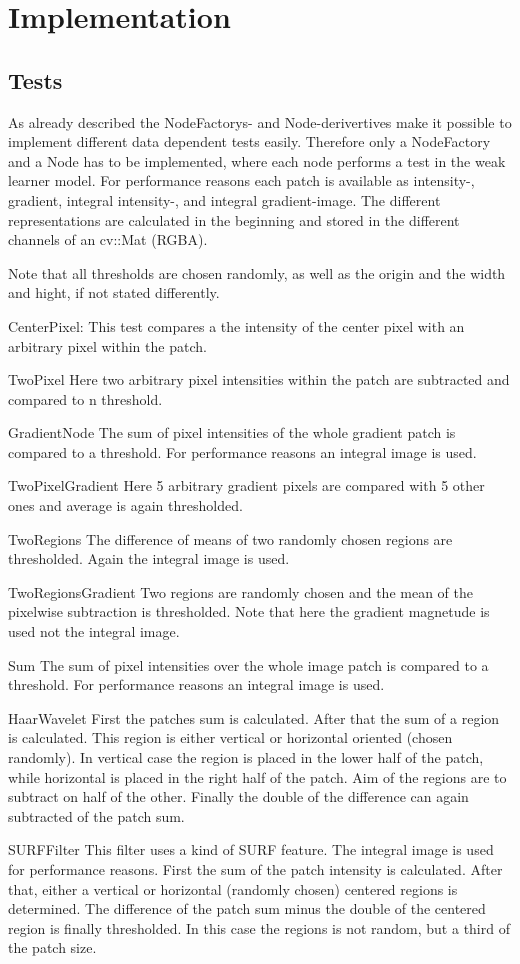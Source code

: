 \section{Implementation}
\label{sec:implementation}

\subsection{Tests}
As already described the NodeFactorys- and Node-derivertives make it possible to implement different data dependent tests easily. Therefore only a NodeFactory and a Node has to be implemented, where each node performs a test in the weak learner model.
For performance reasons each patch is available as intensity-, gradient, integral intensity-, and integral gradient-image. The different representations are calculated in the beginning and stored in the different channels of an cv::Mat (RGBA).

Note that all thresholds are chosen randomly, as well as the origin and the width and hight, if not stated differently.

CenterPixel:
This test compares a the intensity of the center pixel with an arbitrary pixel within the patch.

TwoPixel
Here two arbitrary pixel intensities within the patch are subtracted and compared to n threshold.

GradientNode
The sum of pixel intensities of the whole gradient patch is compared to a threshold. For performance reasons an integral image is used. 

TwoPixelGradient
Here 5 arbitrary gradient pixels are compared with 5 other ones and average is again thresholded.

TwoRegions
The difference of means of two randomly chosen regions are thresholded. Again the integral image is used.

TwoRegionsGradient
Two regions are randomly chosen and the mean of the pixelwise subtraction is thresholded. Note that here the gradient magnetude is used not the integral image.

Sum
The sum of pixel intensities over the whole image patch is compared to a threshold. For performance reasons an integral image is used.

HaarWavelet
First the patches sum is calculated. After that the sum of a region is calculated. This region is either vertical or horizontal oriented (chosen randomly). In vertical case the region is placed in the lower half of the patch, while horizontal is placed in the right half of the patch. Aim of the regions are to subtract on half of the other. Finally the double of the difference can again subtracted of the patch sum.

SURFFilter
This filter uses a kind of SURF feature. The integral image is used for performance reasons. First the sum of the patch intensity is calculated. After that, either a vertical or horizontal (randomly chosen) centered regions is determined. The difference of the patch sum minus the double of the centered region is finally thresholded. In this case the regions is not random, but a third of the patch size.




